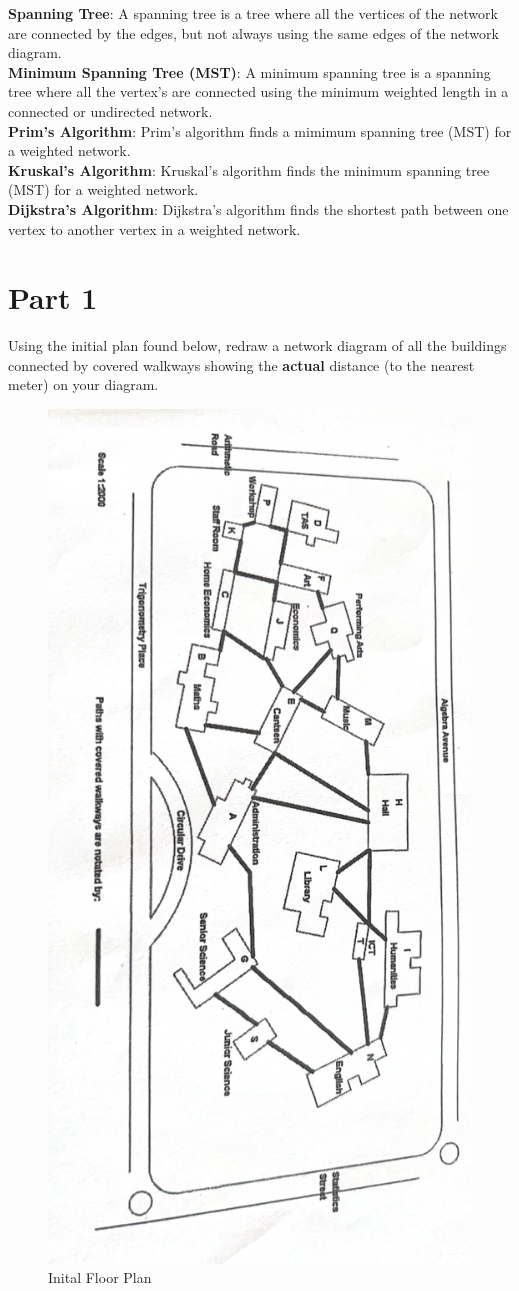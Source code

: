 \documentclass[11pt]{book}
\renewcommand{\=}[1]{\stackrel{#1}{=}} %
\theoremstyle{definition}
\theoremstyle{remark}
\begin{document}
\textbf{Spanning Tree}: A spanning tree is a tree where all the vertices of the network are connected by the edges, but not always using the same edges of the network diagram. \\

\textbf{Minimum Spanning Tree (MST)}: A minimum spanning tree is a spanning tree where all the vertex's are connected using the minimum weighted length in a connected or undirected network. \\

\textbf{Prim's Algorithm}: Prim's algorithm finds a mimimum spanning tree (MST) for a weighted network. \\

\textbf{Kruskal's Algorithm}: Kruskal's algorithm finds the minimum spanning tree (MST) for a weighted network. \\

\textbf{Dijkstra's Algorithm}: Dijkstra's algorithm finds the shortest path between one vertex to another vertex in a weighted network.

\chapter{Part 1}
Using the initial plan found below, redraw a network diagram of all the buildings connected by covered walkways showing the \textbf{actual} distance (to the nearest meter) on your diagram.

\begin{figure}
    \centering
    \includegraphics[width=0.5\linewidth]{img/map_orig.png}
    \caption{Inital Floor Plan}
    \label{fig:enter-label}
\end{figure}
\end{document}
